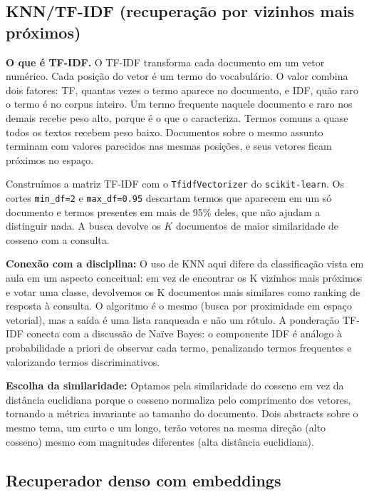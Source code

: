 \documentclass[12pt]{article}
\begin{document}
\subsection{KNN/TF-IDF (recuperação por vizinhos mais próximos)}

\textbf{O que é TF-IDF.} O TF-IDF transforma cada documento em um vetor numérico. Cada posição do vetor é um termo do vocabulário. O valor combina dois fatores: TF, quantas vezes o termo aparece no documento, e IDF, quão raro o termo é no corpus inteiro. Um termo frequente naquele documento e raro nos demais recebe peso alto, porque é o que o caracteriza. Termos comuns a quase todos os textos recebem peso baixo. Documentos sobre o mesmo assunto terminam com valores parecidos nas mesmas posições, e seus vetores ficam próximos no espaço.

Construímos a matriz TF-IDF com o \texttt{TfidfVectorizer} do \texttt{scikit-learn}. Os cortes \texttt{min\_df=2} e \texttt{max\_df=0.95} descartam termos que aparecem em um só documento e termos presentes em mais de 95\% deles, que não ajudam a distinguir nada. A busca devolve os $K$ documentos de maior similaridade de cosseno com a consulta.

\textbf{Conexão com a disciplina:} O uso de KNN aqui difere da classificação vista em aula em um aspecto conceitual: em vez de encontrar os K vizinhos mais próximos e votar uma classe, devolvemos os K documentos mais similares como ranking de resposta à consulta. O algoritmo é o mesmo (busca por proximidade em espaço vetorial), mas a saída é uma lista ranqueada e não um rótulo. A ponderação TF-IDF conecta com a discussão de Naïve Bayes: o componente IDF é análogo à probabilidade a priori de observar cada termo, penalizando termos frequentes e valorizando termos discriminativos.

\textbf{Escolha da similaridade:} Optamos pela similaridade do cosseno em vez da distância euclidiana porque o cosseno normaliza pelo comprimento dos vetores, tornando a métrica invariante ao tamanho do documento. Dois abstracts sobre o mesmo tema, um curto e um longo, terão vetores na mesma direção (alto cosseno) mesmo com magnitudes diferentes (alta distância euclidiana).

\subsection{Recuperador denso com embeddings}
\label{sec:dense}
\end{document}

